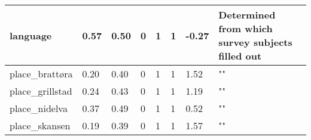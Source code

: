\documentclass{article}
\begin{document}
\begin{center}
\begin{table}[!ht]
\begin{tabular}{|l|l|l|l|l|l|l|l|}
        language & 0.57 & 0.50 & 0 & 1 & 1 & -0.27 & Determined from which survey subjects filled out \\ \hline
        place\_brattøra & 0.20 & 0.40 & 0 & 1 & 1 & 1.52 & "" \\ \hline
        place\_grillstad & 0.24 & 0.43 & 0 & 1 & 1 & 1.19 & "" \\ \hline
        place\_nidelva & 0.37 & 0.49 & 0 & 1 & 1 & 0.52 & "" \\ \hline
        place\_skansen & 0.19 & 0.39 & 0 & 1 & 1 & 1.57 & "" \\ \hline
    \end{tabular}
\end{table}
\end{center}
\end{document}
